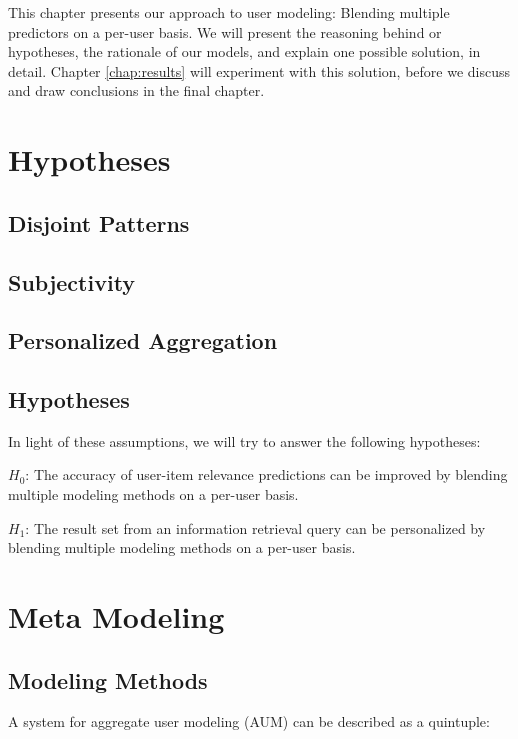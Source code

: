 This chapter presents our approach to user modeling:
Blending multiple predictors on a per-user basis.
We will present the reasoning behind or hypotheses,
the rationale of our models,
and explain one possible solution, in detail.
Chapter \ref{chap:results} will experiment with this solution,
before we discuss and draw conclusions in the final chapter.

\section{Hypotheses}

\subsection{Disjoint Patterns}

\subsection{Subjectivity}

\subsection{Personalized Aggregation}

\subsection{Hypotheses}

In light of these assumptions, we will try to answer the following hypotheses:

$H_{0}$: The accuracy of user-item relevance predictions can be improved
by blending multiple modeling methods on a per-user basis.

$H_{1}$: The result set from an information retrieval query
can be personalized by blending multiple modeling methods on a per-user basis.




\section{Meta Modeling}

\subsection{Modeling Methods}

A system for aggregate user modeling (AUM) can be described as a quintuple:

